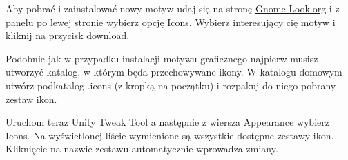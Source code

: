 Aby pobrać i zainstalować nowy motyw udaj się na stronę \href{http://gnome-look.org/}{Gnome-Look.org} i z panelu po lewej stronie wybierz opcję Icons. Wybierz interesujący cię motyw i kliknij na przycisk \textcolor{ubuntu_orange}{download}.

Podobnie jak w przypadku instalacji motywu graficznego najpierw musisz utworzyć katalog, w którym będa przechowywane ikony. W katalogu domowym utwórz podkatalog .icons (z kropką na początku) i rozpakuj do niego pobrany zestaw ikon.

Uruchom teraz \textcolor{ubuntu_orange}{Unity Tweak Tool} a następnie z wiersza \textcolor{ubuntu_orange}{Appearance} wybierz \textcolor{ubuntu_orange}{Icons}. Na wyświetlonej liście wymienione są wszystkie dostępne zestawy ikon. Kliknięcie na nazwie zestawu automatycznie wprowadza zmiany.